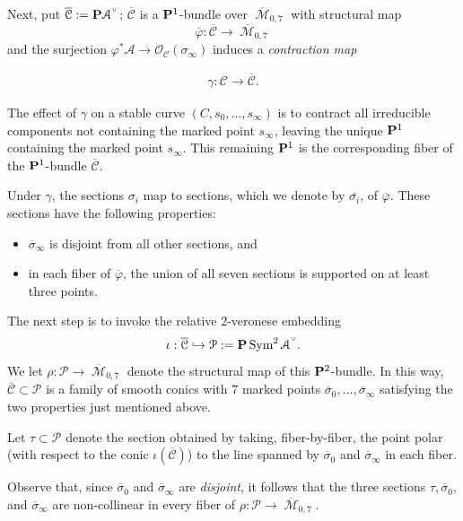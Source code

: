\documentclass[12pt,reqno]{amsart}
\DeclareMathOperator{\M}{\mathcal{M}}
\renewcommand{\to}{{\longrightarrow}}
\numberwithin{equation}{section}
\renewcommand{\O}{\mathcal O}
\newcommand{\cP}{\mathcal P}
\newcommand{\cC}{\mathcal{C}}
\newcommand{\smvee}{\raise0.5ex\hbox{$\scriptscriptstyle\vee$}}
\renewcommand {\o}[1]{\overline{#1}}
\begin{document}
Next, put $\o{\mathcal{C}} := \P \mathcal{A}^{\smvee}$;
$\overline{\mathcal{C}}$ is a $\P^{1}$-bundle over
$\overline{\M}_{0,7}$ with structural map
$$\o{\varphi}: \o{\cC} \to \o{\M}_{0,7}$$ and the surjection
$\varphi^{*}\mathcal{A} \to \O_{\mathcal{C}}(\sigma_{\infty})$ induces
a {\sl contraction map}

\begin{align}
  \label{eq:contract}
  \gamma: \mathcal{C} \to \overline{\mathcal{C}}.
\end{align}

The effect of $\gamma$ on a stable curve $(C, s_0, \dots, s_{\infty})$
is to contract all irreducible components not containing the marked
point $s_{\infty}$, leaving the unique $\P^{1}$ containing the marked
point $s_{\infty}$.  This remaining $\P^{1}$ is the corresponding
fiber of the $\P^{1}$-bundle $\overline{\mathcal{C}}$.

Under $\gamma$, the sections $\sigma_{i}$ map to sections, which we
denote by $\overline{\sigma_{i}}$, of $\o{\varphi}$.  These sections
have the following properties:
\begin{itemize}
\item $\overline{\sigma}_{\infty}$ is disjoint from all other sections, and
\item in each fiber of $\o{\varphi}$, the union of all seven sections
  is supported on at least three points.
\end{itemize}




The next step is to invoke the relative $2$-veronese embedding
$$\iota: \overline{\mathcal{C}} \hookrightarrow \cP:= \P \Sym^{2}\mathcal{A}^{\smvee}.$$
We let $\rho: \cP \to \o{\M}_{0,7}$ denote the structural map of this
$\P^{2}$-bundle.  In this way, $\overline{\mathcal{C}} \subset \cP$ is
a family of smooth conics with $7$ marked points
$\overline{\sigma}_{0}, \dots, \overline{\sigma}_{\infty}$ satisfying
the two properties just mentioned above.

\begin{definition}
  \label{def:tau} Let $\tau \subset \cP$ denote the section obtained
  by taking, fiber-by-fiber, the point polar (with respect to the
  conic $\iota(\overline{\mathcal{C}})$) to the line spanned by
  $\overline{\sigma}_{0}$ and $\overline{\sigma}_{\infty}$ in each
  fiber.
\end{definition}

Observe that, since $\o{\sigma}_{0}$ and $\o{\sigma}_{\infty}$ are {\sl
    disjoint}, it follows that the three sections
  $\tau, \o{\sigma}_{0},$ and $\o{\sigma}_{\infty}$ are non-collinear
  in every fiber of $\rho: \cP \to \o{\M}_{0,7}$.
\end{document}
